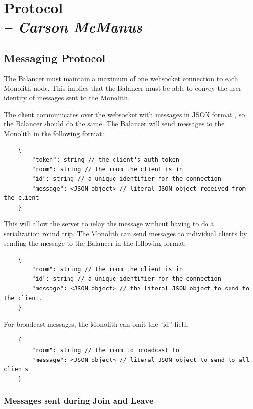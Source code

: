 \chapter{Protocol \\
  \small{\textit{-- Carson McManus}}
  \label{Chapter::Protocol}}

\section{Messaging Protocol}

The Balancer must maintain a maximum of one websocket  connection to each Monolith  node. This implies that the Balancer  must be able to convey the user identity of messages sent to the Monolith.

The client communicates over the websocket with messages in JSON  format , so the Balancer should do the same. The Balancer will send messages to the Monolith in the following format:

\begin{verbatim}
	{
		"token": string // the client's auth token
		"room": string // the room the client is in
		"id": string // a unique identifier for the connection
		"message": <JSON object> // literal JSON object received from the client
	}
\end{verbatim}

This will allow the server to relay the message without having to do a serialization round trip. The Monolith can send messages to individual clients by sending the message to the Balancer in the following format:

\begin{verbatim}
	{
		"room": string // the room the client is in
		"id": string // a unique identifier for the connection
		"message": <JSON object> // the literal JSON object to send to the client.
	}
\end{verbatim}

For broadcast messages, the Monolith can omit the ``id'' field.

\begin{verbatim}
	{
		"room": string // the room to broadcast to
		"message": <JSON object> // literal JSON object to send to all clients
	}
\end{verbatim}



\subsection{Messages sent during Join and Leave}

